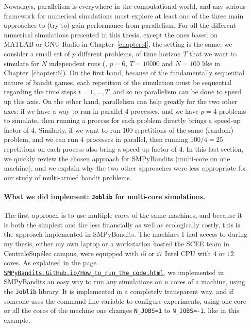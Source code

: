Nowadays, parallelism is everywhere in the computational world, and any serious framework for numerical simulations must explore at least one of the three main approaches to (try to) gain performance from parallelism.
%
For all the different numerical simulations presented in this thesis, except the ones based on MATLAB or GNU Radio in Chapter~\ref{chapter:4}, the setting is the same: we consider a small set of $p$ different problems, of time horizon $T$ that we want to simulate for $N$ independent runs (\eg, $p=6$, $T=10000$ and $N=100$ like in Chapter~\ref{chapter:6}).
On the first hand, because of the fundamentally sequential nature of bandit games, each repetition of the simulation must be sequential regarding the time steps $t=1,\dots,T$, and so no parallelism can be done to speed up this axis.
On the other hand, parallelism can help greatly for the two other axes: if we have a way to run in parallel $4$ processes, and we have $p=4$ problems to simulate, then running a process for each problem directly brings a speed-up factor of $4$.
Similarly, if we want to run $100$ repetitions of the same (random) problem, and we can run $4$ processes in parallel, then running $100/4=25$ repetitions on each process also bring a speed-up factor of $4$.
%
In this last section, we quickly review the chosen approach for SMPyBandits (multi-core on one machine), and we explain why the two other approaches were less appropriate for our study of multi-armed bandit problems.

\paragraph{What we did implement: \texttt{Joblib} for multi-core simulations.}
%
The first approach is to use multiple cores of the same machines, and because it is both the simplest and the less financially as well as ecologically costly, this is the approach implemented in SMPyBandits.
The machines I had access to during my thesis, either my own laptop or a workstation hosted the SCEE team in CentraleSupélec campus, were equipped with $i5$ or $i7$ Intel CPU with $4$ or $12$ cores.
%
As explained in the page \href{https://smpybandits.github.io/How_to_run_the_code.html}{\texttt{SMPyBandits.GitHub.io/How\_to\_run\_the\_code.html}}, we implemented in SMPyBandits an easy way to run any simulations on $n$ cores of a machine, using the \texttt{Joblib} \cite{joblib} library.
It is implemented in a completely transparent way, and if someone uses the command-line variable to configure experiments, using one core or all the cores of the machine one changes \texttt{N\_JOBS=1} to \texttt{N\_JOBS=-1}, like in this example.

